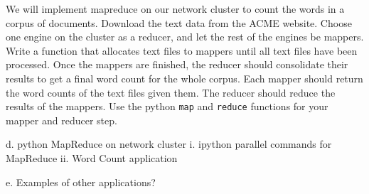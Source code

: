 \begin{problem}
We will implement mapreduce on our network cluster to count the words in a corpus of documents.
Download the text data from the ACME website.
Choose one engine on the cluster as a reducer, and let the rest of the engines be mappers.
Write a function that allocates text files to mappers until all text files have been processed.
Once the mappers are finished, the reducer should consolidate their results to get a final word count for the whole corpus.
Each mapper should return the word counts of the text files given them.
The reducer should reduce the results of the mappers.
Use the python {\tt map} and {\tt reduce} functions for your mapper and reducer step.
\end{problem}
 




%
	
	d. python MapReduce on network cluster
		i. ipython parallel commands for MapReduce
		ii. Word Count application

	e. Examples of other applications?


